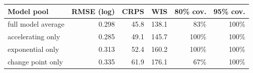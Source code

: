 \begin{tabular}{lrrrrr}
\toprule
Model pool & RMSE (log) & CRPS & WIS & 80\% cov. & 95\% cov. \\
\midrule
full model average & 0.298 & 45.8 & 138.1 & 83\% & 100\% \\
accelerating only & 0.285 & 49.1 & 145.7 & 100\% & 100\% \\
exponential only & 0.313 & 52.4 & 160.2 & 100\% & 100\% \\
change point only & 0.335 & 61.9 & 176.1 & 67\% & 100\% \\
\bottomrule
\end{tabular}
